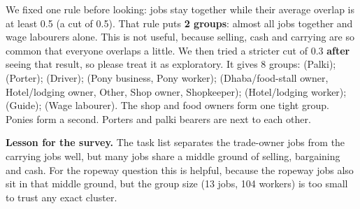 \documentclass[11pt]{article}
\begin{document}
We fixed one rule before looking: jobs stay together while their average overlap is at least 0.5 (a cut of 0.5).
That rule puts \textbf{2 groups}: almost all jobs together and wage labourers alone. This is not useful, because
selling, cash and carrying are so common that everyone overlaps a little. We then tried a stricter cut of 0.3 \textbf{after} seeing that result, so please treat it as exploratory. It gives 8 groups:
(Palki); (Porter); (Driver); (Pony business, Pony worker); (Dhaba/food-stall owner, Hotel/lodging owner, Other, Shop owner, Shopkeeper); (Hotel/lodging worker); (Guide); (Wage labourer).
The shop and food owners form one tight group. Ponies form a second. Porters and palki bearers are next to each other.

\textbf{Lesson for the survey.} The task list separates the trade-owner jobs from the carrying jobs well, but many jobs share a middle ground of selling, bargaining and cash.
For the ropeway question this is helpful, because the ropeway jobs also sit in that middle ground, but the group size (13 jobs, 104 workers) is too small to trust any exact cluster.
\end{document}
